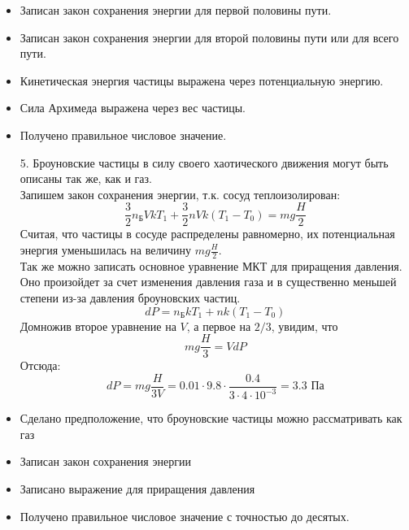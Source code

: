 \begin{itemize}
\item Записан закон сохранения энергии для первой половины пути.
\item Записан закон сохранения энергии для второй половины пути или для всего пути.
\item Кинетическая энергия частицы выражена через потенциальную энергию.
\item Сила Архимеда выражена через вес частицы.
\item Получено правильное числовое значение.
\end{itemize}
\begin{enumerate}
\item[5.] Броуновские частицы в силу своего хаотического движения могут быть описаны так же, как и газ.\\
Запишем закон сохранения энергии, т.к. сосуд теплоизолирован:
$$\frac{3}{2}n_\text{Б}VkT_1+\frac{3}{2}nVk(T_1-T_0 )=mg\frac{H}{2}$$
Считая, что частицы в сосуде распределены равномерно, их потенциальная энергия уменьшилась на величину $mg\frac{H}{2}$.\\
Так же можно записать основное уравнение МКТ для приращения давления. Оно произойдет за счет изменения давления газа и в существенно меньшей степени из-за давления броуновских частиц.
$$dP=n_\text{Б}kT_1+nk(T_1-T_0)$$
Домножив второе уравнение на $V$, а первое на $2/3$, увидим, что
$$mg\frac{H}{3}=VdP$$
Отсюда: 
$$dP=mg\frac{H}{3V}=0.01\cdot9.8\cdot\frac{0.4}{3\cdot4\cdot10^{-3}}=3.3\text{ Па}$$
\end{enumerate}
\begin{itemize}
\item Сделано предположение, что броуновские частицы можно рассматривать как газ
\item Записан закон сохранения энергии
\item Записано выражение для приращения давления
\item Получено правильное числовое значение с точностью до десятых.
\end{itemize}
